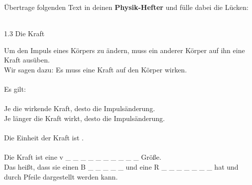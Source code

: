 \documentclass[task=1]{exercise}
\begin{document}
   \task[Heftaufschrieb]
   \"Ubertrage folgenden Text in deinen {\bfseries Physik-Hefter} und f\"ulle dabei die L\"ucken:\\~\\
   \begin{center}
    {\large 1.3 Die Kraft}
   \end{center}
   Um den Impuls eines K\"orpers zu \"andern, muss ein anderer K\"orper auf ihn eine Kraft aus\"uben.\\
   Wir sagen dazu: \glqq Es muss eine Kraft auf den K\"orper wirken.\grqq \\~\\
   Es gilt: \\~\\
   Je \luecke{3cm} die wirkende Kraft, desto \luecke{3cm} die Impuls\"anderung.\\
   Je l\"anger die Kraft wirkt, desto \luecke{3cm} die Impuls\"anderung.\\~\\
   Die Einheit der Kraft ist \luecke{3cm}.\\~\\
   Die Kraft ist eine v \_ \_ \_ \_ \_ \_ \_ \_ \_ \_ Gr\"o{\ss}e.\\
   Das hei{\ss}t, dass sie einen B \_ \_ \_ \_ \_ und eine R \_ \_ \_ \_ \_ \_ \_ hat und durch Pfeile dargestellt werden kann.
\end{document}
